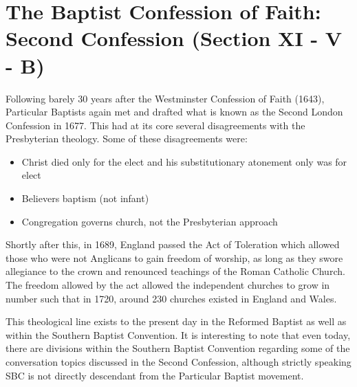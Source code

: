 \documentclass[12pt]{turabian-researchpaper}
\begin{document}
\section{The Baptist Confession of Faith: Second Confession (Section XI - V - B)}

Following barely 30 years after the Westminster Confession of Faith (1643), Particular Baptists again met and drafted what is known as the Second London Confession in 1677.\autocite[pg.402]{woodbridge2013} This had at its core several disagreements with the Presbyterian theology. Some of these disagreements were:\autocite[pg.402]{woodbridge2013} 

\begin{itemize}

\item Christ died only for the elect and his substitutionary atonement only was for elect
\item Believers baptism (not infant)
\item Congregation governs church, not the Presbyterian approach
\end{itemize}

Shortly after this, in 1689, England passed the Act of Toleration which allowed those who were not Anglicans to gain freedom of worship, as long as they swore allegiance to the crown and renounced teachings of the Roman Catholic Church.\autocite[pg.402]{woodbridge2013}  The freedom allowed by the act allowed the independent churches to grow in number such that in 1720, around 230 churches existed in England and Wales.\autocite[pg.402]{woodbridge2013} 

This theological line exists to the present day in the Reformed Baptist as well as within the Southern Baptist Convention.\autocite{wiki:reformedBaptists} It is interesting to note that even today, there are divisions within the Southern Baptist Convention regarding some of the conversation topics discussed in the Second Confession, although strictly speaking SBC is not directly descendant from the Particular Baptist movement.\autocite{wiki:reformedBaptists}

\newpage
\printbibliography
\end{document}
